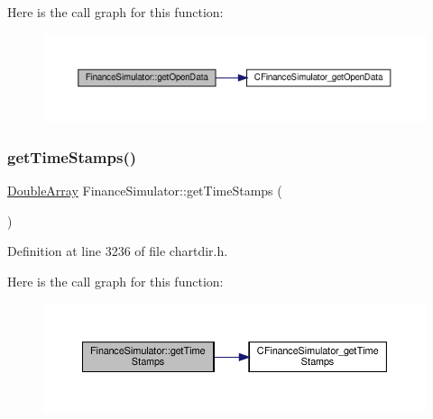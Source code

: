 Here is the call graph for this function\+:
\nopagebreak
\begin{figure}[H]
\begin{center}
\leavevmode
\includegraphics[width=350pt]{class_finance_simulator_aed86f3c9c364cb0ddfb7880c81a591f5_cgraph}
\end{center}
\end{figure}
\mbox{\label{class_finance_simulator_aa3422b709846c868c79e7f7e60ede601}} 
\subsubsection{\texorpdfstring{get\+Time\+Stamps()}{getTimeStamps()}}
{\footnotesize\ttfamily \hyperlink{class_double_array}{Double\+Array} Finance\+Simulator\+::get\+Time\+Stamps (\begin{DoxyParamCaption}{ }\end{DoxyParamCaption})\hspace{0.3cm}{\ttfamily [inline]}}



Definition at line 3236 of file chartdir.\+h.

Here is the call graph for this function\+:
\nopagebreak
\begin{figure}[H]
\begin{center}
\leavevmode
\includegraphics[width=350pt]{class_finance_simulator_aa3422b709846c868c79e7f7e60ede601_cgraph}
\end{center}
\end{figure}
\mbox{\label{class_finance_simulator_ad0ff79eb418099f467eed27305d00b7a}} 
